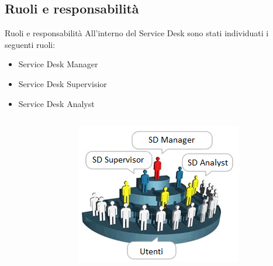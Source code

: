\subsection*{Ruoli e responsabilità}
\begin{frame}{Ruoli e responsabilità}
All'interno del Service Desk sono stati individuati i seguenti ruoli:
\begin{itemize}
\item{Service Desk Manager}
\item{Service Desk Supervisior}
\item{Service Desk Analyst}
\end{itemize}
\begin{columns}
\begin{column}{0.4\textwidth}
\end{column}
\begin{column}{0.6\textwidth}
\begin{figure}
\includegraphics[scale=0.6]{Images/Roles.png}
\end{figure}
\end{column}
\end{columns}
\end{frame}

